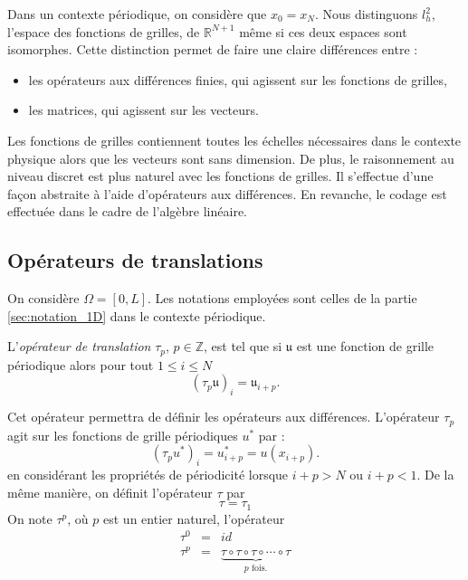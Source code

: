 Dans un contexte périodique, on considère que $x_0 = x_N$.
Nous distinguons $l^2_h$, l'espace des fonctions de grilles, de $\mathbb{R}^{N+1}$ même si ces deux espaces sont isomorphes. Cette distinction permet de faire une claire différences entre :
\begin{itemize}
\item les opérateurs aux différences finies, qui agissent sur les fonctions de grilles,
\item les matrices, qui agissent sur les vecteurs.
\end{itemize}
Les fonctions de grilles contiennent toutes les échelles nécessaires dans le contexte physique alors que les vecteurs sont sans dimension. De plus, le raisonnement au niveau discret est plus naturel avec les fonctions de grilles. Il s'effectue d'une façon abstraite à l'aide d'opérateurs aux différences. En revanche, le codage est effectuée dans le cadre de l'algèbre linéaire.












\subsection{Opérateurs de translations}

On considère $\Omega = [0,L]$. Les notations employées sont celles de la partie \ref{sec:notation_1D} dans le contexte périodique.

\begin{definition}
L'\textit{opérateur de translation} $\tau_p$, $p \in \mathbb{Z}$, est tel que si $\mathfrak{u}$ est une fonction de grille périodique alors pour tout $1 \leq i \leq N$
\begin{equation}
(\tau_p \mathfrak{u})_i = \mathfrak{u}_{i+p}.
\end{equation}
\end{definition}

Cet opérateur permettra de définir les opérateurs aux différences. L'opérateur $\tau_p$ agit sur les fonctions de grille périodiques $u^*$ par :
\begin{equation}
(\tau_p u^*)_i = u^*_{i+p} = u(x_{i+p}).
\end{equation}
en considérant les propriétés de périodicité lorsque $i+p > N$ ou $i+p<1$.
De la même manière, on définit l'opérateur $\tau$ par 
\begin{equation}
\tau = \tau_{1}
\end{equation}
On note $\tau^p$, où $p$ est un entier naturel, l'opérateur
\begin{equation}
\begin{array}{rcl}
\tau^0 & = & id\\
\tau^p & = & \underbrace{\tau \circ \tau \circ \tau \circ \cdots \circ \tau}_{p \text{ fois.}}
\end{array}
\end{equation}

